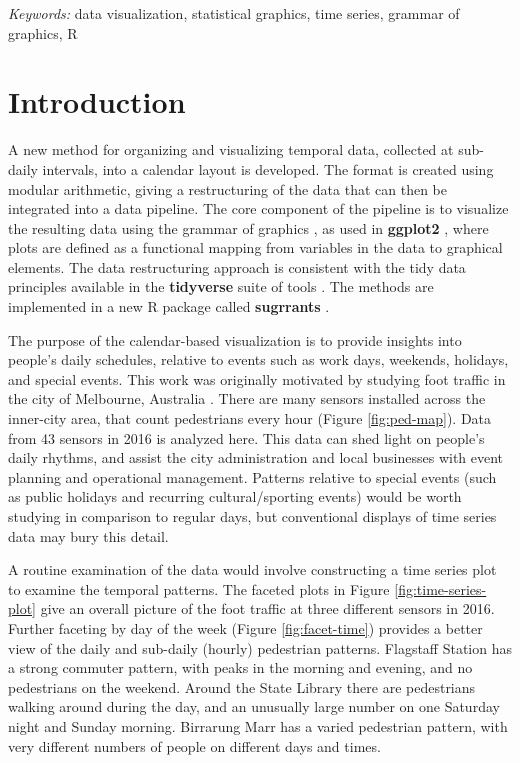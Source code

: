 \documentclass[12pt]{article}
\begin{document}
\noindent%
{\it Keywords:} data visualization, statistical graphics, time series, grammar of graphics, R
\vfill

\newpage
{} %

\hypertarget{introduction}{%
\section{Introduction}\label{introduction}}

A new method for organizing and visualizing temporal data, collected at sub-daily intervals, into a calendar layout is developed. The format is created using modular arithmetic, giving a restructuring of the data that can then be integrated into a data pipeline. The core component of the pipeline is to visualize the resulting data using the grammar of graphics \citep{wilkinson2006grammar, wickham2009ggplot2}, as used in \textbf{ggplot2} \citep{R-ggplot2}, where plots are defined as a functional mapping from variables in the data to graphical elements. The data restructuring approach is consistent with the tidy data principles available in the \textbf{tidyverse} suite of tools \citep{R-tidyverse}. The methods are implemented in a new R package called \textbf{sugrrants} \citep{R-sugrrants}.

The purpose of the calendar-based visualization is to provide insights into people's daily schedules, relative to events such as work days, weekends, holidays, and special events. This work was originally motivated by studying foot traffic in the city of Melbourne, Australia \citep{ped}. There are many sensors installed across the inner-city area, that count pedestrians every hour (Figure \ref{fig:ped-map}). Data from 43 sensors in 2016 is analyzed here. This data can shed light on people's daily rhythms, and assist the city administration and local businesses with event planning and operational management. Patterns relative to special events (such as public holidays and recurring cultural/sporting events) would be worth studying in comparison to regular days, but conventional displays of time series data may bury this detail.

A routine examination of the data would involve constructing a time series plot to examine the temporal patterns. The faceted plots in Figure \ref{fig:time-series-plot} give an overall picture of the foot traffic at three different sensors in 2016. Further faceting by day of the week (Figure \ref{fig:facet-time}) provides a better view of the daily and sub-daily (hourly) pedestrian patterns. Flagstaff Station has a strong commuter pattern, with peaks in the morning and evening, and no pedestrians on the weekend. Around the State Library there are pedestrians walking around during the day, and an unusually large number on one Saturday night and Sunday morning. Birrarung Marr has a varied pedestrian pattern, with very different numbers of people on different days and times.
\end{document}
